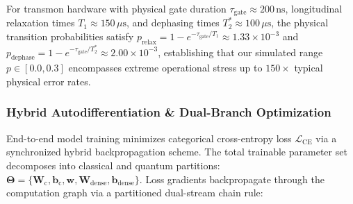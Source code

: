 \documentclass[pdflatex,sn-mathphys-num]{sn-jnl}%
\theoremstyle{thmstyleone}%
\theoremstyle{thmstyletwo}%
\theoremstyle{thmstylethree}%
\begin{document}
For transmon hardware with physical gate duration $\tau_{\mathrm{gate}} \approx 200\,\mathrm{ns}$, longitudinal relaxation times $T_1 \approx 150\,\mu\mathrm{s}$, and dephasing times $T_2^* \approx 100\,\mu\mathrm{s}$, the physical transition probabilities satisfy $p_{\mathrm{relax}} = 1 - e^{-\tau_{\mathrm{gate}}/T_1} \approx 1.33 \times 10^{-3}$ and $p_{\mathrm{dephase}} = 1 - e^{-\tau_{\mathrm{gate}}/T_2^*} \approx 2.00 \times 10^{-3}$, establishing that our simulated range $p \in [0.0, 0.3]$ encompasses extreme operational stress up to $150\times$ typical physical error rates.

\subsubsection{Hybrid Autodifferentiation \& Dual-Branch Optimization}
End-to-end model training minimizes categorical cross-entropy loss $\mathcal{L}_{\mathrm{CE}}$ via a synchronized hybrid backpropagation scheme. The total trainable parameter set decomposes into classical and quantum partitions: $\boldsymbol{\Theta} = \{\mathbf{W}_{\mathrm{c}}, \mathbf{b}_{\mathrm{c}}, \mathbf{w}, \mathbf{W}_{\mathrm{dense}}, \mathbf{b}_{\mathrm{dense}}\}$. Loss gradients backpropagate through the computation graph via a partitioned dual-stream chain rule:
\end{document}
